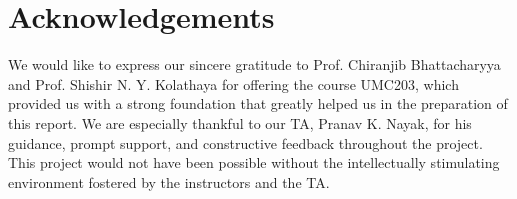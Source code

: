 \documentclass{article}
\begin{document}
\section*{Acknowledgements}
We would like to express our sincere gratitude to Prof. Chiranjib Bhattacharyya and Prof. Shishir N. Y. Kolathaya for offering the course UMC203, which provided us with a strong foundation that greatly helped us in the preparation of this report. We are especially thankful to our TA, Pranav K. Nayak, for his guidance, prompt support, and constructive feedback throughout the project. This project would not have been possible without the intellectually stimulating environment fostered by the instructors and the TA.




\end{document}
